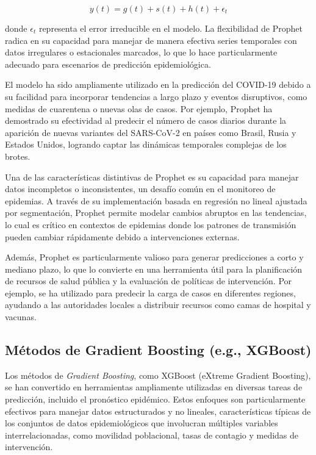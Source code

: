 \[
y(t) = g(t) + s(t) + h(t) + \epsilon_t
\]

donde \( \epsilon_t \) representa el error irreducible en el modelo. La flexibilidad de Prophet radica en su capacidad para manejar de manera efectiva series temporales con datos irregulares o estacionales marcados, lo que lo hace particularmente adecuado para escenarios de predicción epidemiológica\parencite{Baccega2024Sybil}.

El modelo ha sido ampliamente utilizado en la predicción del COVID-19 debido a su facilidad para incorporar tendencias a largo plazo y eventos disruptivos, como medidas de cuarentena o nuevas olas de casos. Por ejemplo, Prophet ha demostrado su efectividad al predecir el número de casos diarios durante la aparición de nuevas variantes del SARS-CoV-2 en países como Brasil, Rusia y Estados Unidos, logrando captar las dinámicas temporales complejas de los brotes\parencite{Baccega2024Sybil, Rodriguez2022DataCentric}.

Una de las características distintivas de Prophet es su capacidad para manejar datos incompletos o inconsistentes, un desafío común en el monitoreo de epidemias. A través de su implementación basada en regresión no lineal ajustada por segmentación, Prophet permite modelar cambios abruptos en las tendencias, lo cual es crítico en contextos de epidemias donde los patrones de transmisión pueden cambiar rápidamente debido a intervenciones externas\parencite{Nguyen2023NZSTGNN}.

Además, Prophet es particularmente valioso para generar predicciones a corto y mediano plazo, lo que lo convierte en una herramienta útil para la planificación de recursos de salud pública y la evaluación de políticas de intervención. Por ejemplo, se ha utilizado para predecir la carga de casos en diferentes regiones, ayudando a las autoridades locales a distribuir recursos como camas de hospital y vacunas\parencite{Baccega2024Sybil, Nguyen2023NZSTGNN}.

\subsection{Métodos de Gradient Boosting (e.g., XGBoost)}\label{section:gradient-boosting}

Los métodos de \textit{Gradient Boosting}, como XGBoost (eXtreme Gradient Boosting), se han convertido en herramientas ampliamente utilizadas en diversas tareas de predicción, incluido el pronóstico epidémico. Estos enfoques son particularmente efectivos para manejar datos estructurados y no lineales, características típicas de los conjuntos de datos epidemiológicos que involucran múltiples variables interrelacionadas, como movilidad poblacional, tasas de contagio y medidas de intervención\parencite{Rodriguez2022DataCentric, Nguyen2023NZSTGNN}.

